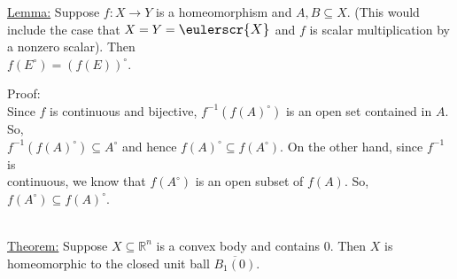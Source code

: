 \documentclass{book}
\newcommand{\mathcalli}[1]{\text{\scalebox{1.11}{$\eulerscr{#1}$}}}
\newcommand{\pracTwo}{
   \color{Orange}%
   \fontsize{12}{14}\selectfont%
}
\newcommand{\exTwo}{%
   \color{Purple}%
   \fontsize{13}{15}\selectfont%
}
\newenvironment{myIndent}{%
   \begin{adjustwidth}{2.5em}{0em}%
}{%
   \end{adjustwidth}%
}
\newcommand{\mySepTwo}[1][.]{%
   {\noindent\color{#1}{\rule{6.5in}{0.5mm}}}\\%
}
\newcommand{\retTwo}{\hfill\bigbreak}
\begin{document}
\ul{Lemma:} Suppose $f: X \to Y$ is a homeomorphism and $A, B \subseteq X$. (This would include the case that $X = Y = \mathcalli{X}$ and $f$ is scalar multiplication by a nonzero scalar). Then\\ $f(E^\circ) = (f(E))^\circ$.
\begin{myIndent}\pracTwo
	Proof:\\
	Since $f$ is continuous and bijective, $f^{-1}(f(A)^\circ)$ is an open set contained in $A$. So,\\ $f^{-1}(f(A)^\circ) \subseteq A^\circ$ and hence $f(A)^\circ \subseteq f(A^\circ)$. On the other hand, since $f^{-1}$ is\\ continuous, we know that $f(A^\circ)$ is an open subset of $f(A)$. So, $f(A^\circ) \subseteq f(A)^\circ$.\retTwo
\end{myIndent}

\mySepTwo

\exTwo\ul{Theorem:} Suppose $X \subseteq \mathbb{R}^n$ is a convex body and contains $0$. Then $X$ is homeomorphic to the closed unit ball $\overline{B_1(0)}$.
\end{document}
